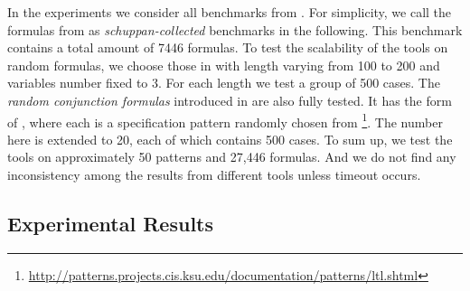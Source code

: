 \documentclass[conference]{IEEEtran}
\begin{document}
In the experiments we consider all benchmarks from
\cite{RV10,SD11,LZPVH13}.
For simplicity, we call the formulas from
\cite{SD11} as \textit{schuppan-collected} benchmarks in the following. This benchmark contains a total amount of 7446 formulas. To test the scalability of the tools on random formulas, we choose those in \cite{RV10} with length varying from 100 to 200 and variables number fixed to 3. For each length we test a group of 500 cases.   The \textit{random conjunction formulas} introduced in \cite{LZPVH13} are also fully tested. It has the form of , where each  is a specification pattern randomly chosen from \cite{DAC98}\footnote{\url{http://patterns.projects.cis.ksu.edu/documentation/patterns/ltl.shtml}}. The number
 here is extended to 20, each of which contains 500 cases. To sum up, we test the tools on approximately 50 patterns and 27,446 formulas. And we do not find any inconsistency among the results from different tools unless timeout occurs. 

\subsection{Experimental Results}



\iffalse
\begin{figure}[t]
\begin{minipage}[b]{0.45\linewidth}
\centering
\texttt{[image: random]}
\caption{Experimental results on extended random formulas with 3 variables.}
\label{fig:random}
\end{minipage}
\hspace{0.6cm}
\begin{minipage}[b]{0.45\linewidth}
\centering
\texttt{[image: random\_conjunction]}
\caption{Experimental results on random conjunction formulas.}
\label{fig:random_conjunction}
\vspace{0.3cm}
\end{minipage}
\end{figure}
\fi
\end{document}
